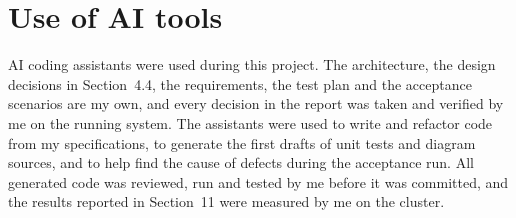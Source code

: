 \documentclass[11pt]{article}
\begin{document}
\section*{Use of AI tools}

AI coding assistants were used during this project. The architecture, the design decisions 
in Section~4.4, the requirements, the test plan and the acceptance scenarios are my own, and 
every decision in the report was taken and verified by me on the running system. The 
assistants were used to write and refactor code from my specifications, to generate the 
first drafts of unit tests and diagram sources, and to help find the cause of defects during 
the acceptance run. All generated code was reviewed, run and tested by me before it was 
committed, and the results reported in Section~11 were measured by me on the cluster.
\end{document}
